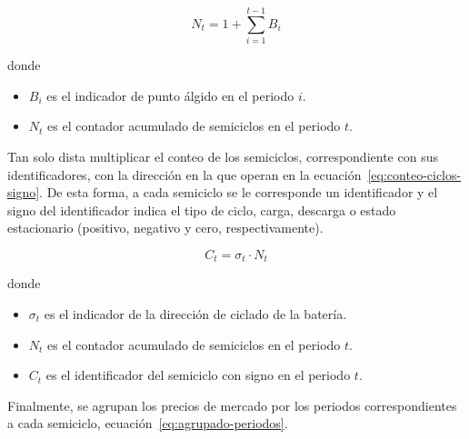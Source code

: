 \begin{samepage}

  \begin{equation}%
    \label{eq:conteo-ciclos}
    N_{t} = 1 + \sum_{i = 1}^{t - 1} B_{i}
  \end{equation}

  donde

  \begin{itemize}

    \item \( B_{i} \) es el indicador de punto álgido en el periodo \( i \).

    \item \( N_{t} \) es el contador acumulado de semiciclos en el periodo \( t \).

  \end{itemize}

\end{samepage}

Tan solo dista multiplicar el conteo de los semiciclos, correspondiente con sus identificadores, con la dirección en la que operan en la ecuación~\ref{eq:conteo-ciclos-signo}. De esta forma, a cada semiciclo se le corresponde un identificador y el signo del identificador indica el tipo de ciclo, carga, descarga o estado estacionario (positivo, negativo y cero, respectivamente).

\begin{samepage}

  \begin{equation}%
    \label{eq:conteo-ciclos-signo}
    C_{t} = \sigma_{t} \cdot N_{t}
  \end{equation}

  donde

  \begin{itemize}

    \item \( \sigma_{t} \) es el indicador de la dirección de ciclado de la batería.

    \item \( N_{t} \) es el contador acumulado de semiciclos en el periodo \( t \).

    \item \( C_{t} \) es el identificador del semiciclo con signo en el periodo \( t \).

  \end{itemize}

\end{samepage}

Finalmente, se agrupan los precios de mercado por los periodos correspondientes a cada semiciclo, ecuación~\ref{eq:agrupado-periodos}.

